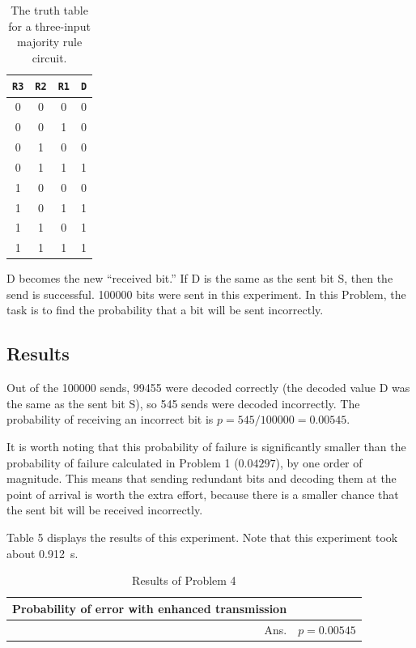 \documentclass{article}
\renewcommand{\c}[1]{\texttt{#1}}
\begin{document}
\begin{table}[H]
    \centering\begin{tabular}{c | c | c || c}
        \c{R3} & \c{R2} & \c{R1} & \c{D} \\ \hline
        0 & 0 & 0 & 0 \\ \hline
        0 & 0 & 1 & 0 \\ \hline
        0 & 1 & 0 & 0 \\ \hline
        0 & 1 & 1 & 1 \\ \hline
        1 & 0 & 0 & 0 \\ \hline
        1 & 0 & 1 & 1 \\ \hline
        1 & 1 & 0 & 1 \\ \hline
        1 & 1 & 1 & 1 \\
    \end{tabular}
    \caption{The truth table for a three-input majority rule circuit.}
    \label{table:majority}
\end{table}

D becomes the new ``received bit.''
If D is the same as the sent bit S, then the send is successful.
\num{100000} bits were sent in this experiment. In this
Problem, the task is to find the probability that a bit
will be sent incorrectly.

\subsection{Results} Out of the \num{100000} sends,
\num{99455} were decoded correctly (the decoded value D
was the same as the sent bit S), so \num{545} sends were
decoded incorrectly. The probability of receiving an
incorrect bit is \(p = \num{545}/\num{100000} = 0.00545\).

It is worth noting that this probability
of failure
is significantly smaller than the probability of failure
calculated in Problem 1 (\(0.04297\)), by one order of
magnitude. This means that sending redundant bits
and decoding them at the point of arrival is worth the
extra effort, because there is a smaller chance that
the sent bit will be received incorrectly.

Table 5 displays the results of this experiment. Note that
this experiment took about \SI{0.912}{\second}.

\begin{table}[H]
    \centering\begin{tabular}{| r | l |}
        \hline
        Probability of error with enhanced transmission & \\ \hline
        Ans. & \(p = 0.00545\) \\ \hline
    \end{tabular}
    \caption{Results of Problem 4}
    \label{table:prob4}
\end{table}
\end{document}
